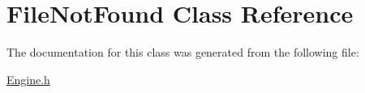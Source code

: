 \hypertarget{class_file_not_found}{}\section{File\+Not\+Found Class Reference}
\label{class_file_not_found}


The documentation for this class was generated from the following file\+:\begin{DoxyCompactItemize}
\item 
\hyperlink{_engine_8h}{Engine.\+h}\end{DoxyCompactItemize}
